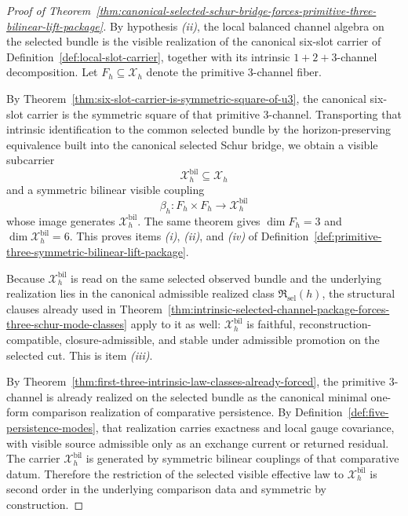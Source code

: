 \begin{proof}[Proof of Theorem~\ref{thm:canonical-selected-schur-bridge-forces-primitive-three-bilinear-lift-package}]
\label{proof:thm:canonical-selected-schur-bridge-forces-primitive-three-bilinear-lift-package}
By hypothesis \emph{(ii)}, the local balanced channel algebra on the selected
bundle is the visible realization of the canonical six-slot carrier of
Definition~\ref{def:local-slot-carrier}, together with its intrinsic
\(1+2+3\)-channel decomposition. Let \(F_h\subseteq \mathcal X_h\) denote the
primitive \(3\)-channel fiber.

By Theorem~\ref{thm:six-slot-carrier-is-symmetric-square-of-u3}, the canonical
six-slot carrier is the symmetric square of that primitive \(3\)-channel.
Transporting that intrinsic identification to the common selected bundle by the
horizon-preserving equivalence built into the canonical selected Schur bridge,
we obtain a visible subcarrier
\[
\mathcal X_h^{\mathrm{bil}}\subseteq \mathcal X_h
\]
and a symmetric bilinear visible coupling
\[
\beta_h:F_h\times F_h\to \mathcal X_h^{\mathrm{bil}}
\]
whose image generates \(\mathcal X_h^{\mathrm{bil}}\). The same theorem gives
\(\dim F_h=3\) and \(\dim \mathcal X_h^{\mathrm{bil}}=6\). This proves items
\emph{(i)}, \emph{(ii)}, and \emph{(iv)} of
Definition~\ref{def:primitive-three-symmetric-bilinear-lift-package}.

Because \(\mathcal X_h^{\mathrm{bil}}\) is read on the same selected observed
bundle and the underlying realization lies in the canonical admissible realized
class \(\mathfrak R_{\mathrm{sel}}(h)\), the structural clauses already used in
Theorem~\ref{thm:intrinsic-selected-channel-package-forces-three-schur-mode-classes}
apply to it as well: \(\mathcal X_h^{\mathrm{bil}}\) is faithful,
reconstruction-compatible, closure-admissible, and stable under admissible
promotion on the selected cut. This is item \emph{(iii)}.

By Theorem~\ref{thm:first-three-intrinsic-law-classes-already-forced}, the
primitive \(3\)-channel is already realized on the selected bundle as the
canonical minimal one-form comparison realization of comparative persistence.
By Definition~\ref{def:five-persistence-modes}, that realization carries
exactness and local gauge covariance, with visible source admissible only as an
exchange current or returned residual. The carrier
\(\mathcal X_h^{\mathrm{bil}}\) is generated by symmetric bilinear couplings of
that comparative datum. Therefore the restriction of the selected visible
effective law to \(\mathcal X_h^{\mathrm{bil}}\) is second order in the
underlying comparison data and symmetric by construction.


\end{proof}
